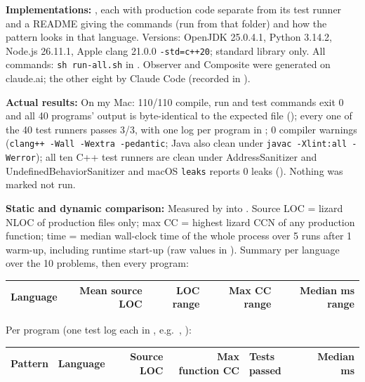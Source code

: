 \documentclass[11pt,a4paper]{article}
\newcommand{\entry}[1]{\textbf{#1:} }
\begin{document}
\entry{Implementations}, each with production code separate from its test runner and a README giving the commands (run from that folder) and how the pattern looks in that language. Versions: OpenJDK 25.0.4.1, Python 3.14.2, Node.js 26.11.1, Apple clang 21.0.0 \texttt{-std=c++20}; standard library only. All commands: \texttt{sh run-all.sh} in . Observer and Composite were generated on claude.ai; the other eight by Claude Code (recorded in ).

\entry{Actual results}On my Mac: 110/110 compile, run and test commands exit 0 and all 40 programs' output is byte-identical to the expected file (); every one of the 40 test runners passes 3/3, with one log per program in ; 0 compiler warnings (\texttt{clang++ -Wall -Wextra -pedantic}; Java also clean under \texttt{javac -Xlint:all -Werror}); all ten C++ test runners are clean under AddressSanitizer and UndefinedBehaviorSanitizer and macOS \texttt{leaks} reports 0 leaks (). Nothing was marked not run.

\entry{Static and dynamic comparison}Measured by  into . Source LOC = lizard NLOC of production files only; max CC = highest lizard CCN of any production function; time = median wall-clock time of the whole process over 5 runs after 1 warm-up, including runtime start-up (raw values in ). Summary per language over the 10 problems, then every program:

\begin{tabular}{@{}lrrrr@{}}\toprule
Language & Mean source LOC & LOC range & Max CC range & Median ms range\\\midrule
\bottomrule\end{tabular}

Per program (one test log each in , e.g.\ , ):

\begin{longtable}{@{}llrrlr@{}}\toprule
Pattern & Language & Source LOC & Max function CC & Tests passed & Median ms\\\midrule\endhead
\bottomrule\end{longtable}
\end{document}
